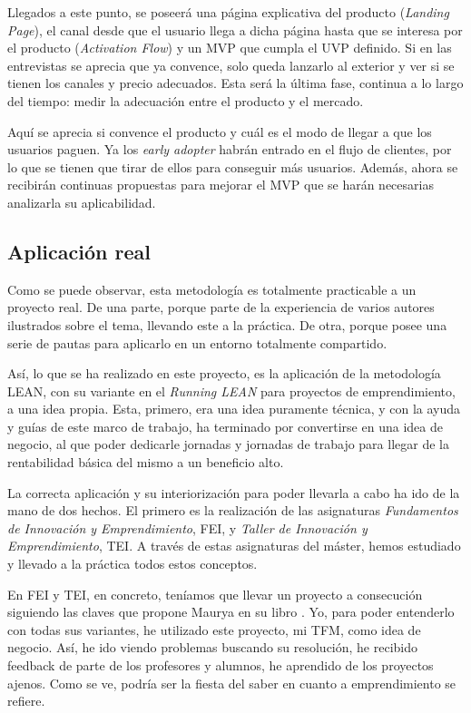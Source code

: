 Llegados a este punto, se poseerá una página explicativa del producto (\textit{Landing Page}), el canal desde que el usuario llega a dicha página hasta que se interesa por el producto (\textit{Activation Flow}) y un MVP que cumpla el UVP definido. Si en las entrevistas se aprecia que ya convence, solo queda lanzarlo al exterior y ver si se tienen los canales y precio adecuados. Esta será la última fase, continua a lo largo del tiempo: medir la adecuación entre el producto y el mercado.

Aquí se aprecia si convence el producto y cuál es el modo de llegar a que los usuarios paguen. Ya los \textit{early adopter} habrán entrado en el flujo de clientes, por lo que se tienen que tirar de ellos para conseguir más usuarios. Además, ahora se recibirán continuas propuestas para mejorar el MVP que se harán necesarias analizarla su aplicabilidad.

\subsection{Aplicación real}

Como se puede observar, esta metodología es totalmente practicable a un proyecto real. De una parte, porque parte de la experiencia de varios autores ilustrados sobre el tema, llevando este a la práctica. De otra, porque posee una serie de pautas para aplicarlo en un entorno totalmente compartido.

Así, lo que se ha realizado en este proyecto, es la aplicación de la metodología LEAN, con su variante en el \textit{Running LEAN} para proyectos de emprendimiento, a una idea propia. Esta, primero, era una idea puramente técnica, y con la ayuda y guías de este marco de trabajo, ha terminado por convertirse en una idea de negocio, al que poder dedicarle jornadas y jornadas de trabajo para llegar de la rentabilidad básica del mismo a un beneficio alto.

La correcta aplicación y su interiorización para poder llevarla a cabo ha ido de la mano de dos hechos. El primero es la realización de las asignaturas \textit{Fundamentos de Innovación y Emprendimiento}, FEI, y \textit{Taller de Innovación y Emprendimiento}, TEI. A través de estas asignaturas del máster, hemos estudiado y llevado a la práctica todos estos conceptos.

En FEI y TEI, en concreto, teníamos que llevar un proyecto a consecución siguiendo las claves que propone Maurya en su libro . Yo, para poder entenderlo con todas sus variantes, he utilizado este proyecto, mi TFM, como idea de negocio. Así, he ido viendo problemas buscando su resolución, he recibido feedback de parte de los profesores y alumnos, he aprendido de los proyectos ajenos. Como se ve, podría ser la fiesta del saber en cuanto a emprendimiento se refiere.

